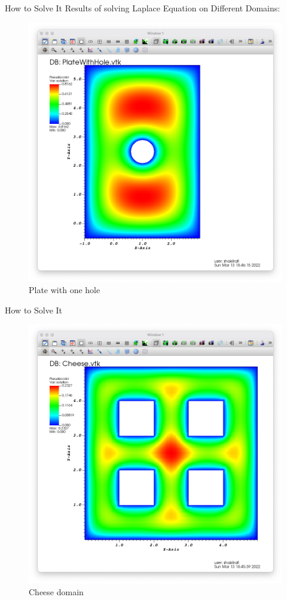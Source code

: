 \documentclass{beamer}
\begin{document}
\begin{frame}{How to Solve It}
    Results of solving Laplace Equation on Different Domains:
    \begin{figure}
        \includegraphics[scale = 0.2]{PlateWithHole.png}
        \caption{Plate with one hole}
    \end{figure} \quad
\end{frame}
\begin{frame}{How to Solve It}
    \begin{figure}
        \includegraphics[scale = 0.2]{Cheese.png}
        \caption{Cheese domain}
    \end{figure}
\end{frame}
\begin{frame}
    
\end{frame}
\end{document}
